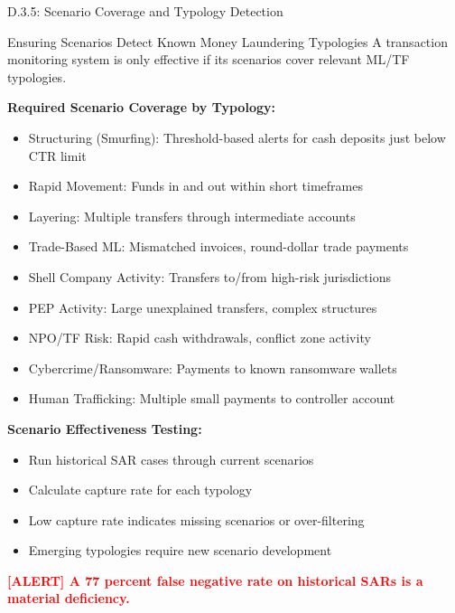 \documentclass[11pt,a4paper]{beamer}
\newcommand{\redflag}[1]{\textcolor{red}{\textbf{[ALERT] #1}}}
\begin{document}
\begin{frame}{D.3.5: Scenario Coverage and Typology Detection}
	\begin{block}{Ensuring Scenarios Detect Known Money Laundering Typologies}
		A transaction monitoring system is only effective if its scenarios cover relevant ML/TF typologies.
	\end{block}
	\textbf{Required Scenario Coverage by Typology:}
	\begin{itemize}
		\item Structuring (Smurfing): Threshold-based alerts for cash deposits just below CTR limit
		\item Rapid Movement: Funds in and out within short timeframes
		\item Layering: Multiple transfers through intermediate accounts
		\item Trade-Based ML: Mismatched invoices, round-dollar trade payments
		\item Shell Company Activity: Transfers to/from high-risk jurisdictions
		\item PEP Activity: Large unexplained transfers, complex structures
		\item NPO/TF Risk: Rapid cash withdrawals, conflict zone activity
		\item Cybercrime/Ransomware: Payments to known ransomware wallets
		\item Human Trafficking: Multiple small payments to controller account
	\end{itemize}
	\textbf{Scenario Effectiveness Testing:}
	\begin{itemize}
		\item Run historical SAR cases through current scenarios
		\item Calculate capture rate for each typology
		\item Low capture rate indicates missing scenarios or over-filtering
		\item Emerging typologies require new scenario development
	\end{itemize}
	\redflag{A 77 percent false negative rate on historical SARs is a material deficiency.}
\end{frame}
\end{document}
